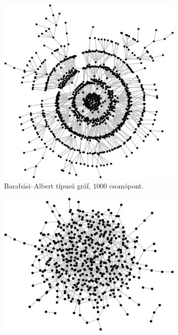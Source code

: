 \begin{figure}[ht]
  \begin{subfigure}[b]{0.5\linewidth}
    \centering
    \includegraphics[width=1\linewidth]{images/barabasi_albert_model.png}
    \caption{ Barabási–Albert típusú gráf, $1000$ csomópont. }
    \label{fig:BARABASI_ALBERT_MODEL}
    \vspace{4ex}
  \end{subfigure}%
  \begin{subfigure}[b]{0.5\linewidth}
    \centering
    \includegraphics[width=1\linewidth]{images/erdos_renyi_model.png}

\end{subfigure}
\end{figure}

